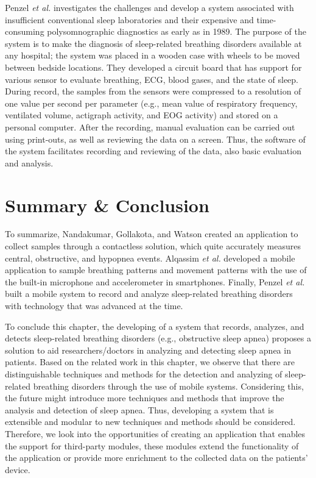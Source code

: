 Penzel \textit{et al.} \cite{mobilesleeplab} investigates the challenges and develop a system associated with insufficient conventional sleep laboratories and their expensive and time-consuming polysomnographic diagnostics as early as in 1989. The purpose of the system is to make the diagnosis of sleep-related breathing disorders available at any hospital; the system was placed in a wooden case with wheels to be moved between bedside locations. They developed a circuit board that has support for various sensor to evaluate breathing, ECG, blood gases, and the state of sleep. During record, the samples from the sensors were compressed to a resolution of one value per second per parameter (e.g., mean value of respiratory frequency, ventilated volume, actigraph activity, and EOG activity) and stored on a personal computer. After the recording, manual evaluation can be carried out using print-outs, as well as reviewing the data on a screen. Thus, the software of the system facilitates recording and reviewing of the data, also basic evaluation and analysis. 

\section{Summary \& Conclusion}

To summarize, Nandakumar, Gollakota, and Watson created an application to collect samples through a contactless solution, which quite accurately measures central, obstructive, and hypopnea events. Alqassim \textit{et al.} developed a mobile application to sample breathing patterns and movement patterns with the use of the built-in microphone and accelerometer in smartphones. Finally, Penzel \textit{et al.} built a mobile system to record and analyze sleep-related breathing disorders with technology that was advanced at the time.

To conclude this chapter, the developing of a system that records, analyzes, and detects sleep-related breathing disorders (e.g., obstructive sleep apnea) proposes a solution to aid researchers/doctors in analyzing and detecting sleep apnea in patients. Based on the related work in this chapter,  we observe that there are distinguishable techniques and methods for the detection and analyzing of sleep-related breathing disorders through the use of mobile systems. Considering this, the future might introduce more techniques and methods that improve the analysis and detection of sleep apnea. Thus, developing a system that is extensible and modular to new techniques and methods should be considered. Therefore, we look into the opportunities of creating an application that enables the support for third-party modules, these modules extend the functionality of the application or provide more enrichment to the collected data on the patients' device.